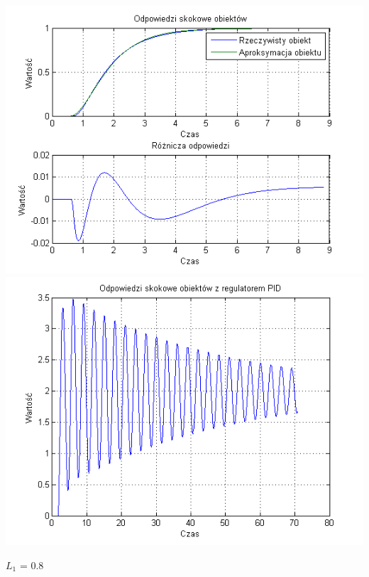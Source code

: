\documentclass[10pt,a4paper]{article}
\begin{document}
\begin{center}
\includegraphics[scale=1]{images/dwa/skrypt_165.png}\\
\includegraphics[scale=1]{images/dwa/skrypt_166.png}\\
\end{center}
\newpage
$L_1$ = 0.8
\end{document}
